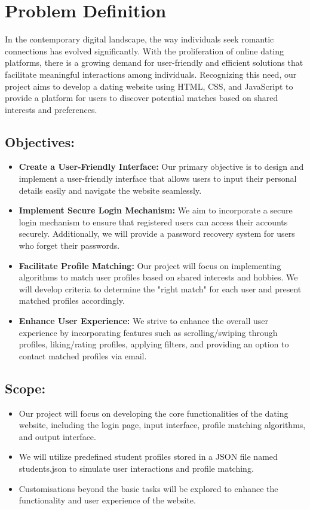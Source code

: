 \chapter{Problem Definition}

In the contemporary digital landscape, the way individuals seek romantic connections has evolved significantly. With the proliferation of online dating platforms, there is a growing demand for user-friendly and efficient solutions that facilitate meaningful interactions among individuals. Recognizing this need, our project aims to develop a dating website using HTML, CSS, and JavaScript to provide a platform for users to discover potential matches based on shared interests and preferences.
\section{Objectives:}
\begin{itemize}
    \item \textbf{Create a User-Friendly Interface:} Our primary objective is to design and implement a user-friendly interface that allows users to input their personal details easily and navigate the website seamlessly.
    \item \textbf{Implement Secure Login Mechanism:} We aim to incorporate a secure login mechanism to ensure that registered users can access their accounts securely. Additionally, we will provide a password recovery system for users who forget their passwords.
    \item \textbf{Facilitate Profile Matching:} Our project will focus on implementing algorithms to match user profiles based on shared interests and hobbies. We will develop criteria to determine the "right match" for each user and present matched profiles accordingly.
    \item \textbf{Enhance User Experience:} We strive to enhance the overall user experience by incorporating features such as scrolling/swiping through profiles, liking/rating profiles, applying filters, and providing an option to contact matched profiles via email.
\end{itemize}

\section{Scope:}
\begin{itemize}
    \item Our project will focus on developing the core functionalities of the dating website, including the login page, input interface, profile matching algorithms, and output interface.
    \item We will utilize predefined student profiles stored in a JSON file named students.json to simulate user interactions and profile matching.
    \item Customisations beyond the basic tasks will be explored to enhance the functionality and user experience of the website.
\end{itemize}





